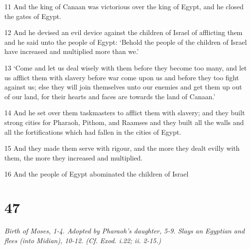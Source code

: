 \par 11 And the king of Canaan was victorious over the king of Egypt, and he closed the gates of Egypt.
\par 12 And he devised an evil device against the children of Israel of afflicting them and he said unto the people of Egypt: ‘Behold the people of the children of Israel have increased and multiplied more than we.’
\par 13 ‘Come and let us deal wisely with them before they become too many, and let us afflict them with slavery before war come upon us and before they too fight against us; else they will join themselves unto our enemies and get them up out of our land, for their hearts and faces are towards the land of Canaan.’
\par 14 And he set over them taskmasters to afflict them with slavery; and they built strong cities for Pharaoh, Pithom, and Raamses and they built all the walls and all the fortifications which had fallen in the cities of Egypt.
\par 15 And they made them serve with rigour, and the more they dealt evilly with them, the more they increased and multiplied.
\par 16 And the people of Egypt abominated the children of Israel

\chapter{47}

\par \textit{Birth of Moses, 1-4. Adopted by Pharaoh's daughter, 5-9. Slays an Egyptian and flees (into Midian), 10-12. (Cf. Exod. i.22; ii. 2-15.)}

